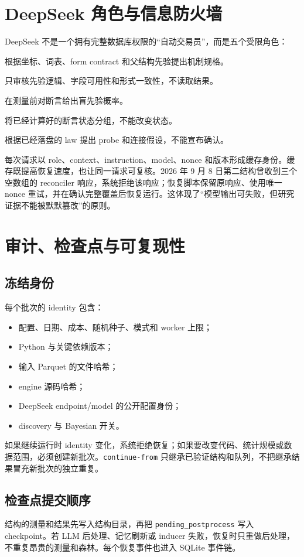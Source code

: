 \documentclass[11pt,a4paper]{article}
\newcommand{\code}[1]{\texttt{#1}}
\begin{document}
\section{DeepSeek 角色与信息防火墙}
DeepSeek 不是一个拥有完整数据库权限的“自动交易员”，而是五个受限角色：
\begin{description}[leftmargin=2em]
  \item[proposer] 根据坐标、词表、form contract 和父结构先验提出机制规格。
  \item[reviewer] 只审核先验逻辑、字段可用性和形式一致性，不读取结果。
  \item[bettor] 在测量前对断言给出盲先验概率。
  \item[reconciler] 将已经计算好的断言状态分组，不能改变状态。
  \item[inducer] 根据已经落盘的 law 提出 probe 和连接假设，不能宣布确认。
\end{description}

每次请求以 role、context、instruction、model、nonce 和版本形成缓存身份。缓存既提高恢复速度，也让同一请求可复核。2026 年 9 月 8 日第二结构曾收到三个空数组的 reconciler 响应，系统拒绝该响应；恢复脚本保留原响应、使用唯一 nonce 重试，并在确认完整覆盖后恢复运行。这体现了“模型输出可失败，但研究证据不能被默默篡改”的原则。

\section{审计、检查点与可复现性}
\subsection{冻结身份}
每个批次的 identity 包含：
\begin{itemize}[leftmargin=2em]
  \item 配置、日期、成本、随机种子、模式和 worker 上限；
  \item Python 与关键依赖版本；
  \item 输入 Parquet 的文件哈希；
  \item engine 源码哈希；
  \item DeepSeek endpoint/model 的公开配置身份；
  \item discovery 与 Bayesian 开关。
\end{itemize}

如果继续运行时 identity 变化，系统拒绝恢复；如果要改变代码、统计规模或数据范围，必须创建新批次。\code{continue-from} 只继承已验证结构和队列，不把继承结果冒充新批次的独立重复。

\subsection{检查点提交顺序}
结构的测量和结果先写入结构目录，再把 \code{pending\_postprocess} 写入 checkpoint。若 LLM 后处理、记忆刷新或 inducer 失败，恢复时只重做后处理，不重复昂贵的测量和森林。每个恢复事件也进入 SQLite 事件链。
\end{document}
